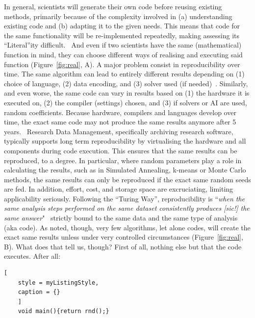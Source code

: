 \documentclass{eceasst}
\begin{document}
In general, scientists will generate their own code before reusing existing methods, primarily because of the complexity involved in (a) understanding existing code and (b) adapting it to the given needs. This means that code for the same functionality will be re-implemented repeatedly, making assessing its “Literal”ity difficult.  And even if two scientists have the same (mathematical) function in mind, they can choose different ways of realising and executing said function (Figure~\ref{fig:real}, A). A major problem consist in reproducibility over time. The same algorithm can lead to entirely different results depending on (1) choice of language, (2) data encoding, and (3) solver used (if needed)~\cite{hennessy_new_2019}. Similarly, and even worse, the same code can vary in results based on (1) the hardware it is executed on, (2) the compiler (settings) chosen, and (3) if solvers or AI are used, random coefficients. Because hardware, compilers and languages develop over time, the exact same code may not produce the same results anymore after 5 years.  Research Data Management, specifically archiving research software, typically supports long term reproducibility by virtualising the hardware and all components during code execution. This ensures that the same results can be reproduced, to a degree. In particular, where random parameters play a role in calculating the results, such as in Simulated Annealing, k-means or Monte Carlo methods, the same results can only be reproduced if the exact same random seeds are fed. In addition, effort, cost, and storage space are excruciating, limiting applicability seriously. Following the “Turing Way”, reproducibility is “\textit{when the same analysis steps performed on the same dataset consistently produces [sic!] the same answer}"~\cite{the_turing_way_community_turing_2025} strictly bound to the same data and the same type of analysis (aka code). As noted, though, very few algorithms, let alone codes, will create the exact same results unless under very controlled circumstances (Figure~\ref{fig:real}, B). What does that tell us, though? First of all, nothing else but that the code executes. After all: 

\begin{lstlisting}[
    style = myListingStyle,
    caption = {}
    ]
    void main(){return rnd();}
\end{lstlisting}
\end{document}
